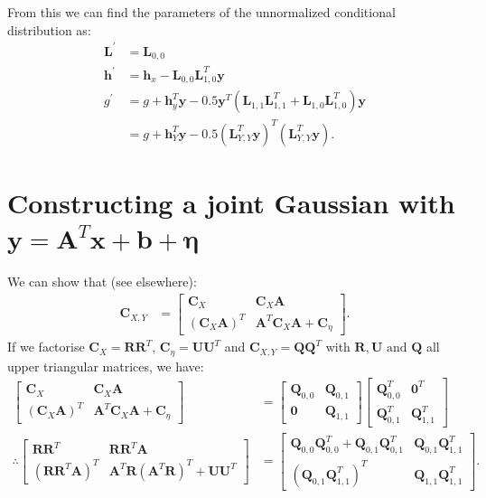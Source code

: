\documentclass[oneside,english]{scrbook}
\begin{document}
From this we can find the parameters of the unnormalized conditional distribution as:
\begin{align}
  \bm{L}^{'} &= \bm{L}_{0,0} \\
  \bm{h}^{'} &= \bm{h}_x-\bm{L}_{0,0}\bm{L}_{1,0}^T\bm{y} \\
  g^{'}      &= g + \bm{h}_y^T\bm{y} -0.5  \bm{y}^T(\bm{L}_{1,1}\bm{L}_{1,1}^T+\bm{L}_{1,0}\bm{L}_{1,0}^T)\bm{y} \nonumber\\
             &= g + \bm{h}_Y^T\bm{y}-0.5(\bm{L}_{Y,Y}^T\bm{y})^T(\bm{L}_{Y,Y}^T\bm{y}).
\end{align}

\section{Constructing a joint Gaussian with $\bm{y} = \bm{A}^T\bm{x} + \bm{b} + \bm{\eta}$}
We can show that (see elsewhere):
\begin{align*}
  \bm{C}_{X,Y} &=
  \begin{bmatrix}
    \bm{C}_{X} & \bm{C}_{X}\bm{A} \\
    (\bm{C}_{X}\bm{A})^T & \bm{A}^T\bm{C}_{X}\bm{A} + \bm{C}_{\eta}
  \end{bmatrix}.
\end{align*}
If we factorise $\bm{C}_{X} = \bm{R}\bm{R}^T$, $\bm{C}_{\eta} =
\bm{U}\bm{U}^T$ and $\bm{C}_{X,Y} = \bm{Q}\bm{Q}^T$ with
$\bm{R},\bm{U} \text{ and } \bm{Q}$ all upper triangular matrices, we
have:
\begin{align*}
  \begin{bmatrix}
    \bm{C}_{X} & \bm{C}_{X}\bm{A} \\
    (\bm{C}_{X}\bm{A})^T & \bm{A}^T\bm{C}_{X}\bm{A} + \bm{C}_{\eta}
  \end{bmatrix}
  &=
  \begin{bmatrix}
    \bm{Q}_{0,0} & \bm{Q}_{0,1}\\
    \bm{0} & \bm{Q}_{1,1}
  \end{bmatrix}
  \begin{bmatrix}
    \bm{Q}_{0,0}^T & \bm{0}^T\\
    \bm{Q}_{0,1}^T & \bm{Q}_{1,1}^T
  \end{bmatrix}\\
  \therefore
  \begin{bmatrix}
    \bm{R}\bm{R}^T & \bm{R}\bm{R}^T\bm{A} \\
    (\bm{R}\bm{R}^T\bm{A})^T & \bm{A}^T\bm{R}(\bm{A}^T\bm{R})^T + \bm{U}\bm{U}^T
  \end{bmatrix}
  &=
  \begin{bmatrix}
    \bm{Q}_{0,0}\bm{Q}_{0,0}^T+ \bm{Q}_{0,1}\bm{Q}_{0,1}^T & \bm{Q}_{0,1}\bm{Q}_{1,1}^T\\
    (\bm{Q}_{0,1}\bm{Q}_{1,1}^T)^T & \bm{Q}_{1,1}\bm{Q}_{1,1}^T
  \end{bmatrix}.
\end{align*}
\end{document}
